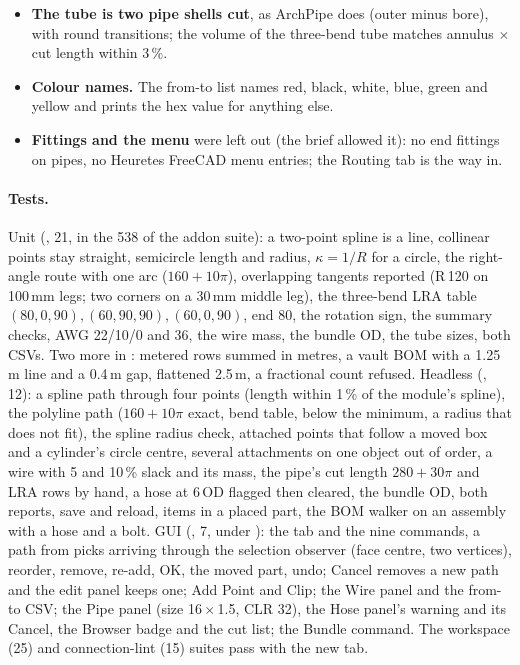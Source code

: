 \begin{itemize}[nosep]
  \item \textbf{The tube is two pipe shells cut}, as ArchPipe does (outer minus bore), with round transitions; the
        volume of the three-bend tube matches annulus $\times$ cut length within 3\,\%.
  \item \textbf{Colour names.} The from-to list names red, black, white, blue, green and yellow and prints the hex
        value for anything else.
  \item \textbf{Fittings and the menu} were left out (the brief allowed it): no end fittings on pipes, no Heuretes FreeCAD
        menu entries; the Routing tab is the way in.
\end{itemize}

\paragraph{Tests.} Unit (, 21, in the 538 of the addon suite): a two-point
spline is a line, collinear points stay straight, semicircle length and radius, $\kappa=1/R$ for a circle, the
right-angle route with one arc ($160+10\pi$), overlapping tangents reported (R\,120 on 100\,mm legs; two corners on a
30\,mm middle leg), the three-bend LRA table $(80,0,90),(60,90,90),(60,0,90)$, end 80, the rotation sign, the
summary checks, AWG 22/10/0 and 36, the wire mass, the bundle OD, the tube sizes, both CSVs. Two more in
: metered rows summed in metres, a vault BOM with a 1.25\,m line and a 0.4\,m gap, flattened
2.5\,m, a fractional count refused. Headless (, 12): a spline path through four
points (length within 1\,\% of the module's spline), the polyline path ($160+10\pi$ exact, bend table, below the
minimum, a radius that does not fit), the spline radius check, attached points that follow a moved box and a
cylinder's circle centre, several attachments on one object out of order, a wire with 5 and 10\,\% slack and its
mass, the pipe's cut length $280+30\pi$ and LRA rows by hand, a hose at $6\,$OD flagged then cleared, the bundle OD,
both reports, save and reload, items in a placed part, the BOM walker on an assembly with a hose and a bolt. GUI
(, 7, under ): the tab and the nine commands, a path from
picks arriving through the selection observer (face centre, two vertices), reorder, remove, re-add, OK, the moved
part, undo; Cancel removes a new path and the edit panel keeps one; Add Point and Clip; the Wire panel and the
from-to CSV; the Pipe panel (size 16\,$\times$\,1.5, CLR 32), the Hose panel's warning and its Cancel, the Browser
badge and the cut list; the Bundle command. The workspace (25) and connection-lint (15) suites pass with the new
tab.

